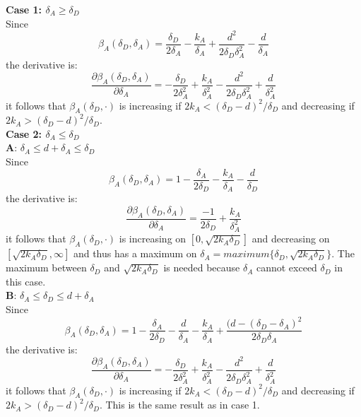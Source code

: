 \textbf{Case 1: $\delta_{A} \geq \delta_{D}$}\\

Since 
\begin{equation*}
\beta_{A}(\delta_{D},\delta_{A}) =\dfrac{\delta_{D}}{2\delta_{A}} - \dfrac{k_{A}}{\delta_{A}} + \dfrac{d^{2}}{2\delta_{D}\delta_{A}^{2}} - \dfrac{d}{\delta_{A}}
\end{equation*}
the derivative is:
\begin{equation*}
\dfrac{\partial \beta_{A}(\delta_{D},\delta_{A})}{\partial \delta_{A}} = -\dfrac{\delta_{D}}{2\delta_{A}^{2}} + \dfrac{k_{A}}{\delta_{A}^{2}} - \dfrac{d^{2}}{2\delta_{D}\delta_{A}^{2}} + \dfrac{d}{\delta_{A}^{2}}
\end{equation*}
it follows that $\beta_{A}(\delta_{D},\cdot)$ is increasing if $2k_{A} < (\delta_{D} - d)^{2} / \delta_{D}$ and decreasing if $2k_{A} > (\delta_{D} - d)^{2} / \delta_{D}$. \\

\textbf{Case 2: $\delta_{A} \leq \delta_{D}$ } \\

\textbf{A}: $\delta_{A} \leq d + \delta_{A} \leq \delta_{D}$ \\
Since 
\begin{equation*}
\beta_{A}(\delta_{D},\delta_{A}) =1- \dfrac{\delta_{A}}{2\delta_{D}} - \dfrac{k_{A}}{\delta_{A}} - \dfrac{d}{\delta_{D}}
\end{equation*}
the derivative is:
\begin{equation*}
\dfrac{\partial \beta_{A}(\delta_{D},\delta_{A})}{\partial \delta_{A}} = \dfrac{-1}{2\delta_{D}} + \dfrac{k_{A}}{\delta_{A}^{2}}
\end{equation*}
it follows that $\beta_{A}(\delta_{D},\cdot)$ is increasing on $[0,\sqrt{2k_{A}\delta_{D}}]$ and decreasing on $[\sqrt{2k_{A}\delta_{D}}, \infty]$ and thus has a maximum on $\delta_{A} = maximum \{\delta_{D}, \sqrt{2k_{A}\delta_{D}} \} $. The maximum between $\delta_{D}$ and $ \sqrt{2k_{A}\delta_{D}}$ is needed because $\delta_{A} $ cannot exceed $\delta_{D}$ in this case. \\

\textbf{B}: $\delta_{A}  \leq \delta_{D} \leq d + \delta_{A} $ \\

Since 
\begin{equation*}
\beta_{A}(\delta_{D},\delta_{A}) = 1 - \dfrac{\delta_{A}}{2\delta_{D}} - \dfrac{d}{\delta_{A}} - \dfrac{k_{A}}{\delta_{A}} + \dfrac{(d-(\delta_{D}-\delta_{A})^{2}}{2\delta_{D}\delta_{A}} 
\end{equation*}
the derivative is:
\begin{equation*}
\dfrac{\partial \beta_{A}(\delta_{D},\delta_{A})}{\partial \delta_{A}} = -\dfrac{\delta_{D}}{2\delta_{A}^{2}} + \dfrac{k_{A}}{\delta_{A}^{2}} - \dfrac{d^{2}}{2\delta_{D}\delta_{A}^{2}} + \dfrac{d}{\delta_{A}^{2}}
\end{equation*}
it follows that $\beta_{A}(\delta_{D},\cdot)$ is increasing if $2k_{A} < (\delta_{D} - d)^{2} / \delta_{D}$ and decreasing if $2k_{A} > (\delta_{D} - d)^{2} / \delta_{D}$. This is the same result as in case 1.\\

%
